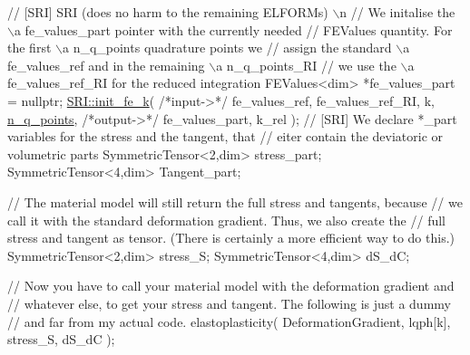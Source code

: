 \begin{DoxyCode}
            \textcolor{comment}{// [SRI] SRI (does no harm to the remaining ELFORMs) \(\backslash\)n}
            \textcolor{comment}{// We initalise the \(\backslash\)a fe\_values\_part pointer with the currently needed}
            \textcolor{comment}{// FEValues quantity. For the first \(\backslash\)a n\_q\_points quadrature points we}
            \textcolor{comment}{// assign the standard \(\backslash\)a fe\_values\_ref and in the remaining \(\backslash\)a n\_q\_points\_RI}
            \textcolor{comment}{// we use the \(\backslash\)a fe\_values\_ref\_RI for the reduced integration}
             FEValues<dim> *fe\_values\_part = \textcolor{keyword}{nullptr};
             \hyperlink{namespaceSRI_a304be230ce6414b79b92c2921ad38524}{SRI::init\_fe\_k}( \textcolor{comment}{/*input->*/} fe\_values\_ref, fe\_values\_ref\_RI, k, 
      \hyperlink{assembly__routine__SRI_8cc_afd52b693751274175b93a58458201e6b}{n\_q\_points},
                             \textcolor{comment}{/*output->*/} fe\_values\_part, k\_rel );
            \textcolor{comment}{// [SRI] We declare *\_part variables for the stress and the tangent, that}
            \textcolor{comment}{// eiter contain the deviatoric or volumetric parts}
             SymmetricTensor<2,dim> stress\_part;
             SymmetricTensor<4,dim> Tangent\_part;

            \textcolor{comment}{// The material model will still return the full stress and tangents, because}
            \textcolor{comment}{// we call it with the standard deformation gradient. Thus, we also create the}
            \textcolor{comment}{// full stress and tangent as tensor. (There is certainly a more efficient way to do this.)}
             SymmetricTensor<2,dim> stress\_S;
             SymmetricTensor<4,dim> dS\_dC;

            \textcolor{comment}{// Now you have to call your material model with the deformation gradient and}
            \textcolor{comment}{// whatever else, to get your stress and tangent. The following is just a dummy}
            \textcolor{comment}{// and far from my actual code.}
             elastoplasticity( DeformationGradient, lqph[k], stress\_S, dS\_dC );


\end{DoxyCode}
